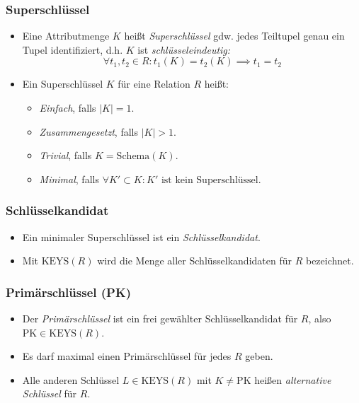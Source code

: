 \documentclass[a4paper, 11pt, accentcolor = tud3b]{tudreport}
\providecommand{\abs}[1]{\ensuremath{{\lvert #1 \rvert}}}
\newcommand{\Schema}{\text{Schema}}
\newcommand{\KEYS}{\text{KEYS}}
\newcommand{\PK}{\text{PK}}
\begin{document}
                \subsubsection{Superschlüssel} %
                    \begin{itemize}
                    	\item Eine Attributmenge \(K\) heißt \textit{Superschlüssel} gdw. jedes Teiltupel genau ein Tupel identifiziert, d.h. \(K\) ist \textit{schlüsseleindeutig:}
                    		\begin{equation*}
	                    		\forall t_1, t_2 \in R : t_1(K) = t_2(K) \implies t_1 = t_2
                    		\end{equation*}
                    	\item Ein Superschlüssel \(K\) für eine Relation \(R\) heißt:
                    		\begin{itemize}
                    			\item \textit{Einfach}, falls \( \abs{K} = 1 \).
                    			\item \textit{Zusammengesetzt}, falls \( \abs{K} > 1 \).
                    			\item \textit{Trivial}, falls \(K = \Schema(K)\).
                    			\item \textit{Minimal}, falls \( \forall K' \subset K : K' \text{ ist kein Superschlüssel} \).
                    		\end{itemize}
                    \end{itemize}

                \subsubsection{Schlüsselkandidat} %
                	\begin{itemize}
                		\item Ein minimaler Superschlüssel ist ein \textit{Schlüsselkandidat}.
                		\item Mit \( \KEYS(R) \) wird die Menge aller Schlüsselkandidaten für \(R\) bezeichnet.
                	\end{itemize}

                \subsubsection{Primärschlüssel (PK)} %
                    \begin{itemize}
                    	\item Der \textit{Primärschlüssel} ist ein frei gewählter Schlüsselkandidat für \(R\), also \( \PK \in \KEYS(R) \).
                    	\item Es darf maximal einen Primärschlüssel für jedes \(R\) geben.
                    	\item Alle anderen Schlüssel \( L \in \KEYS(R) \) mit \( K \neq \PK \) heißen \textit{alternative Schlüssel} für \(R\).
                    \end{itemize}
\end{document}
